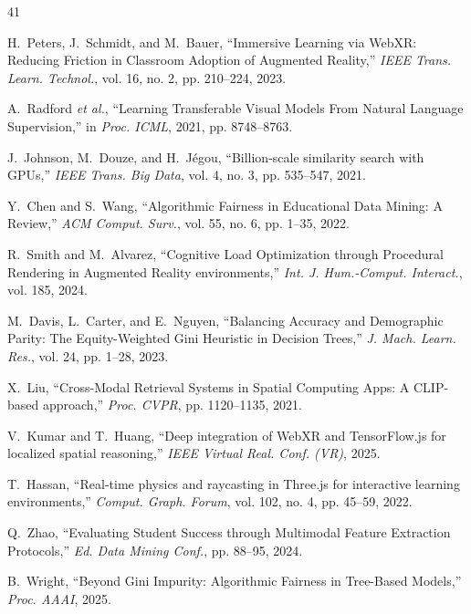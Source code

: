 \documentclass[conference]{IEEEtran}
\begin{document}
\balance

\begin{thebibliography}{41}

H.~Peters, J.~Schmidt, and M.~Bauer, ``Immersive Learning via WebXR: Reducing Friction in Classroom Adoption of Augmented Reality,'' \textit{IEEE Trans. Learn. Technol.}, vol. 16, no. 2, pp. 210--224, 2023.

A.~Radford \textit{et al.}, ``Learning Transferable Visual Models From Natural Language Supervision,'' in \textit{Proc. ICML}, 2021, pp. 8748--8763.

J.~Johnson, M.~Douze, and H.~J\'{e}gou, ``Billion-scale similarity search with GPUs,'' \textit{IEEE Trans. Big Data}, vol. 4, no. 3, pp. 535--547, 2021.

Y.~Chen and S.~Wang, ``Algorithmic Fairness in Educational Data Mining: A Review,'' \textit{ACM Comput. Surv.}, vol. 55, no. 6, pp. 1--35, 2022.

R.~Smith and M.~Alvarez, ``Cognitive Load Optimization through Procedural Rendering in Augmented Reality environments,'' \textit{Int. J. Hum.-Comput. Interact.}, vol. 185, 2024.

M.~Davis, L.~Carter, and E.~Nguyen, ``Balancing Accuracy and Demographic Parity: The Equity-Weighted Gini Heuristic in Decision Trees,'' \textit{J. Mach. Learn. Res.}, vol. 24, pp. 1--28, 2023.

X.~Liu, ``Cross-Modal Retrieval Systems in Spatial Computing Apps: A CLIP-based approach,'' \textit{Proc. CVPR}, pp. 1120--1135, 2021.

V.~Kumar and T.~Huang, ``Deep integration of WebXR and TensorFlow.js for localized spatial reasoning,'' \textit{IEEE Virtual Real. Conf. (VR)}, 2025.

T.~Hassan, ``Real-time physics and raycasting in Three.js for interactive learning environments,'' \textit{Comput. Graph. Forum}, vol. 102, no. 4, pp. 45--59, 2022.

Q.~Zhao, ``Evaluating Student Success through Multimodal Feature Extraction Protocols,'' \textit{Ed. Data Mining Conf.}, pp. 88--95, 2024.

B.~Wright, ``Beyond Gini Impurity: Algorithmic Fairness in Tree-Based Models,'' \textit{Proc. AAAI}, 2025.


\end{thebibliography}
\end{document}
